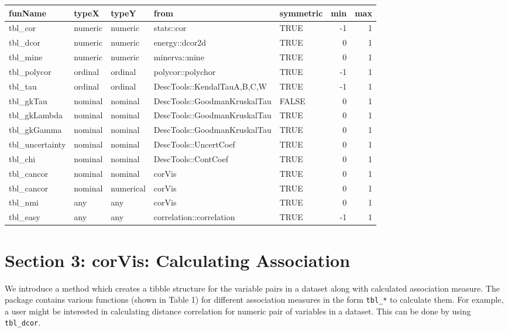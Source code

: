 \begin{Schunk}

\begin{tabular}[t]{lllllrr}
\toprule
funName & typeX & typeY & from & symmetric & min & max\\
\midrule
tbl\_cor & numeric & numeric & stats::cor & TRUE & -1 & 1\\
tbl\_dcor & numeric & numeric & energy::dcor2d & TRUE & 0 & 1\\
tbl\_mine & numeric & numeric & minerva::mine & TRUE & 0 & 1\\
tbl\_polycor & ordinal & ordinal & polycor::polychor & TRUE & -1 & 1\\
tbl\_tau & ordinal & ordinal & DescTools::KendalTauA,B,C,W & TRUE & -1 & 1\\
\addlinespace
tbl\_gkTau & nominal & nominal & DescTools::GoodmanKruskalTau & FALSE & 0 & 1\\
tbl\_gkLambda & nominal & nominal & DescTools::GoodmanKruskalTau & TRUE & 0 & 1\\
tbl\_gkGamma & nominal & nominal & DescTools::GoodmanKruskalTau & TRUE & 0 & 1\\
tbl\_uncertainty & nominal & nominal & DescTools::UncertCoef & TRUE & 0 & 1\\
tbl\_chi & nominal & nominal & DescTools::ContCoef & TRUE & 0 & 1\\
\addlinespace
tbl\_cancor & nominal & nominal & corVis & TRUE & 0 & 1\\
tbl\_cancor & nominal & numerical & corVis & TRUE & 0 & 1\\
tbl\_nmi & any & any & corVis & TRUE & 0 & 1\\
tbl\_easy & any & any & correlation::correlation & TRUE & -1 & 1\\
\bottomrule
\end{tabular}

\end{Schunk}

\hypertarget{section-3-corvis-calculating-association}{%
\section{Section 3: corVis: Calculating
Association}\label{section-3-corvis-calculating-association}}

We introduce a method which creates a tibble structure for the variable
pairs in a dataset along with calculated association measure. The
package contains various functions (shown in Table 1) for different
association measures in the form \texttt{tbl\_*} to calculate them. For
example, a user might be interested in calculating distance correlation
for numeric pair of variables in a dataset. This can be done by using
\texttt{tbl\_dcor}.


